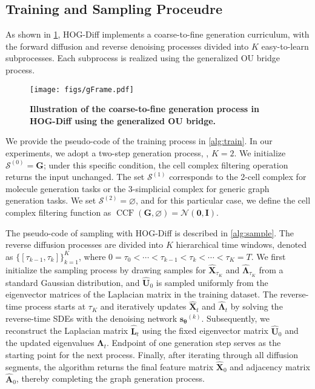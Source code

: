 \subsection{Training and Sampling Proceudre}

As shown in \cref{fig:gFrame}, HOG-Diff implements a coarse-to-fine generation curriculum, with the forward diffusion and reverse denoising processes divided into $K$ easy-to-learn subprocesses. Each subprocess is realized using the generalized OU bridge process.


\begin{figure}[!ht]
    \centering
    \texttt{[image: figs/gFrame.pdf]}
    \caption{\textbf{Illustration of the coarse-to-fine generation process in HOG-Diff using the generalized OU bridge.}}
    \label{fig:gFrame}
\end{figure}


We provide the pseudo-code of the training process in \cref{alg:train}. In our experiments, we adopt a two-step generation process, \ie, $K=2$.  
We initialize $\mathcal{S}^{(0)} = \bm{G}$; under this specific condition, the cell complex filtering operation returns the input unchanged. The set $\mathcal{S}^{(1)}$ corresponds to the 2-cell complex for molecule generation tasks or the 3-simplicial complex for generic graph generation tasks. 
We set $\mathcal{S}^{(2)} = \varnothing$, and for this particular case, we define the cell complex filtering function as
$\operatorname{CCF}(\bm{G}, \varnothing) = \mathcal{N}(\bm{0}, \bm{I})$.



The pseudo-code of sampling with HOG-Diff is described in \cref{alg:sample}.
The reverse diffusion processes are divided into $K$ hierarchical time windows, denoted as  $\{[\tau_{k-1},\tau_k]\}_{k=1}^K$, where $0 = \tau_0 < \cdots < \tau_{k-1}< \tau_k < \cdots < \tau_K = T$.
We first initialize the sampling process by drawing samples for $\widehat{\bm{X}}_{\tau_K}$ and $\widehat{\bm{\Lambda}}_{\tau_K}$ from a standard Gaussian distribution, and $\widehat{\bm{U}}_0$ is sampled uniformly from the eigenvector matrices of the Laplacian matrix in the training dataset. 
The reverse-time process starts at $\tau_K$ and iteratively updates $\widehat{\bm{X}}_t$ and $\widehat{\bm{\Lambda}}_t$ by solving the reverse-time SDEs with the denoising network $\bm{s_\theta}^{(k)}$.
Subsequently, we reconstruct the Laplacian matrix $\widehat{\bm{L}}_t$ using the fixed eigenvector matrix $\widehat{\bm{U}}_0$ and the updated eigenvalues $\widehat{\bm{\Lambda}}_t$.
%
Endpoint of one generation step serves as the starting point for the next process.
%
Finally, after iterating through all diffusion segments, the algorithm returns the final feature matrix $\widehat{\bm{X}}_0$ and adjacency matrix $\widehat{\bm{A}}_0$, thereby completing the graph generation process. 



